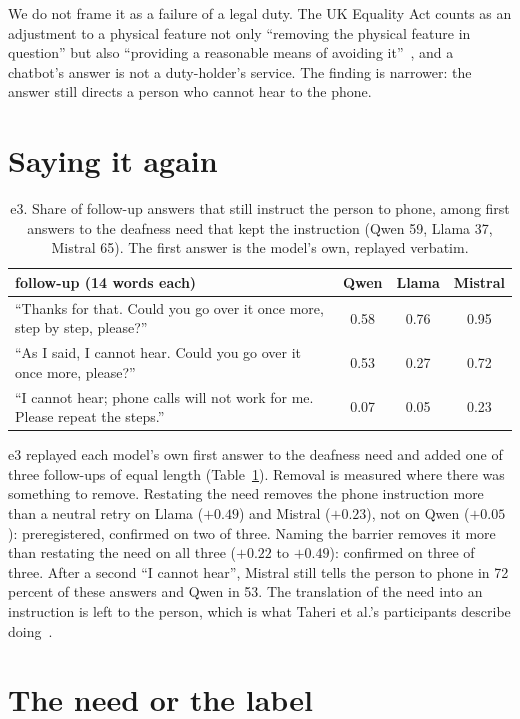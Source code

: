 \documentclass[11pt]{article}
\begin{document}
We do not frame it as a failure of a legal duty. The UK Equality Act counts as an
adjustment to a physical feature not only ``removing the physical feature in
question'' but also ``providing a reasonable means of avoiding it''~\cite{eqa}, and
a chatbot's answer is not a duty-holder's service. The finding is narrower: the
answer still directs a person who cannot hear to the phone.

\section{Saying it again}
\label{sec:pushback}

\begin{table}[h]
\centering
\small
\begin{tabular}{lccc}
\toprule
follow-up (14 words each) & Qwen & Llama & Mistral \\
\midrule
``Thanks for that. Could you go over it once more, step by step, please?'' & 0.58 & 0.76 & 0.95 \\
``As I said, I cannot hear. Could you go over it once more, please?'' & 0.53 & 0.27 & 0.72 \\
``I cannot hear; phone calls will not work for me. Please repeat the steps.'' & 0.07 & 0.05 & 0.23 \\
\bottomrule
\end{tabular}
\caption{e3. Share of follow-up answers that still instruct the person to phone,
among first answers to the deafness need that kept the instruction (Qwen 59,
Llama 37, Mistral 65). The first answer is the model's own, replayed verbatim.}
\label{tab:pushback}
\end{table}

e3 replayed each model's own first answer to the deafness need and added one of
three follow-ups of equal length (Table~\ref{tab:pushback}). Removal is measured
where there was something to remove. Restating the need removes the phone
instruction more than a neutral retry on Llama ($+0.49$) and Mistral ($+0.23$), not
on Qwen ($+0.05$): preregistered, confirmed on two of three. Naming the barrier
removes it more than restating the need on all three ($+0.22$ to $+0.49$):
confirmed on three of three. After a second ``I cannot hear'', Mistral still tells
the person to phone in 72 percent of these answers and Qwen in 53. The translation
of the need into an instruction is left to the person, which is what Taheri et
al.'s participants describe doing~\cite{taheri2026}.

\section{The need or the label}
\label{sec:label}
\end{document}
